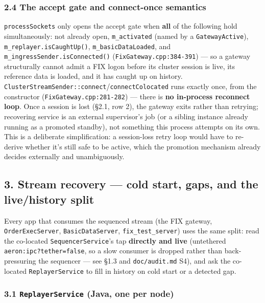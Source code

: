 \documentclass[
  10pt,
]{article}
\begin{document}
\subsubsection{2.4 The accept gate and connect-once
semantics}\label{the-accept-gate-and-connect-once-semantics}

\texttt{processSockets} only opens the accept gate when \textbf{all} of
the following hold simultaneously: not already open,
\texttt{m\_activated} (named by a \texttt{GatewayActive}),
\texttt{m\_replayer.isCaughtUp()}, \texttt{m\_basicDataLoaded}, and
\texttt{m\_ingressSender.isConnected()}
(\texttt{FixGateway.cpp:384-391}) --- so a gateway structurally cannot
admit a FIX logon before its cluster session is live, its reference data
is loaded, and it has caught up on history.
\texttt{ClusterStreamSender::connect}/\texttt{connectColocated} runs
exactly once, from the constructor (\texttt{FixGateway.cpp:281-282}) ---
there is \textbf{no in-process reconnect loop}. Once a session is lost
(§2.1, row 2), the gateway exits rather than retrying; recovering
service is an external supervisor's job (or a sibling instance already
running as a promoted standby), not something this process attempts on
its own. This is a deliberate simplification: a session-loss retry loop
would have to re-derive whether it's still safe to be active, which the
promotion mechanism already decides externally and unambiguously.

\subsection{3. Stream recovery --- cold start, gaps, and the
live/history
split}\label{stream-recovery-cold-start-gaps-and-the-livehistory-split}

Every app that consumes the sequenced stream (the FIX gateway,
\texttt{OrderExecServer}, \texttt{BasicDataServer},
\texttt{fix\_test\_server}) uses the same split: read the co-located
\texttt{SequencerService}'s tap \textbf{directly and live} (untethered
\texttt{aeron:ipc?tether=false}, so a slow consumer is dropped rather
than back-pressuring the sequencer --- see §1.3 and
\texttt{doc/audit.md} S4), and ask the co-located
\texttt{ReplayerService} to fill in history on cold start or a detected
gap.

\subsubsection{\texorpdfstring{3.1 \texttt{ReplayerService} (Java, one
per
node)}{3.1 ReplayerService (Java, one per node)}}\label{replayerservice-java-one-per-node}
\end{document}
